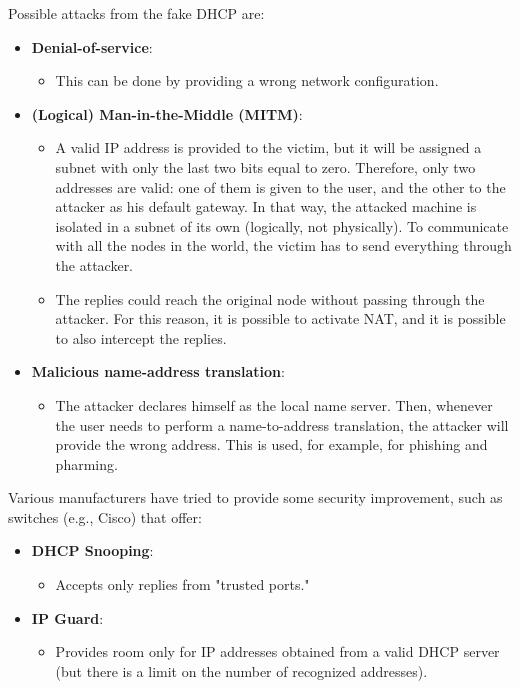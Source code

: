 Possible attacks from the fake DHCP are:

\begin{itemize}
    \item \textbf{Denial-of-service}:
          \begin{itemize}
              \item This can be done by providing a wrong network configuration.
          \end{itemize}

    \item \textbf{(Logical) Man-in-the-Middle (MITM)}:
          \begin{itemize}
              \item A valid IP address is provided to the victim, but it will be assigned a subnet with only the last two bits equal to zero. Therefore, only two addresses are valid: one of them is given to the user, and the other to the attacker as his default gateway. In that way, the attacked machine is isolated in a subnet of its own (logically, not physically). To communicate with all the nodes in the world, the victim has to send everything through the attacker.
              \item The replies could reach the original node without passing through the attacker. For this reason, it is possible to activate NAT, and it is possible to also intercept the replies.
          \end{itemize}

    \item \textbf{Malicious name-address translation}:
          \begin{itemize}
              \item The attacker declares himself as the local name server. Then, whenever the user needs to perform a name-to-address translation, the attacker will provide the wrong address. This is used, for example, for phishing and pharming.
          \end{itemize}
\end{itemize}

Various manufacturers have tried to provide some security improvement, such as switches (e.g., Cisco) that offer:

\begin{itemize}
    \item \textbf{DHCP Snooping}:
          \begin{itemize}
              \item Accepts only replies from "trusted ports."
          \end{itemize}

    \item \textbf{IP Guard}:
          \begin{itemize}
              \item Provides room only for IP addresses obtained from a valid DHCP server (but there is a limit on the number of recognized addresses).
          \end{itemize}
\end{itemize}

